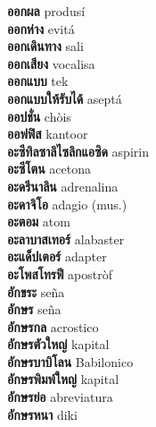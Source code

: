 \textbf{ ออกผล  } produsí \\
\textbf{ ออกห่าง  } evitá \\
\textbf{ ออกเดินทาง  } sali \\
\textbf{ ออกเสียง  } vocalisa \\
\textbf{ ออกแบบ  } tek \\
\textbf{ ออกแบบให้รับได้  } aseptá \\
\textbf{ ออปชั่น  } chòis \\
\textbf{ ออฟฟิส  } kantoor \\
\textbf{ อะซีทิลซาลิไซลิกแอซิด  } aspirin \\
\textbf{ อะซีโตน  } acetona \\
\textbf{ อะดรีนาลิน  } adrenalina \\
\textbf{ อะดาจิโอ  } adagio (mus.) \\
\textbf{ อะตอม  } atom \\
\textbf{ อะลาบาสเทอร์  } alabaster \\
\textbf{ อะแด็ปเตอร์  } adapter \\
\textbf{ อะโพสโทรฟี  } apostròf \\
\textbf{ อักขระ  } seña \\
\textbf{ อักษร  } seña \\
\textbf{ อักษรกล  } acrostico \\
\textbf{ อักษรตัวใหญ่  } kapital \\
\textbf{ อักษรบาบิโลน  } Babilonico \\
\textbf{ อักษรพิมพ์ใหญ่  } kapital \\
\textbf{ อักษรย่อ  } abreviatura \\
\textbf{ อักษรหนา  } diki \\

